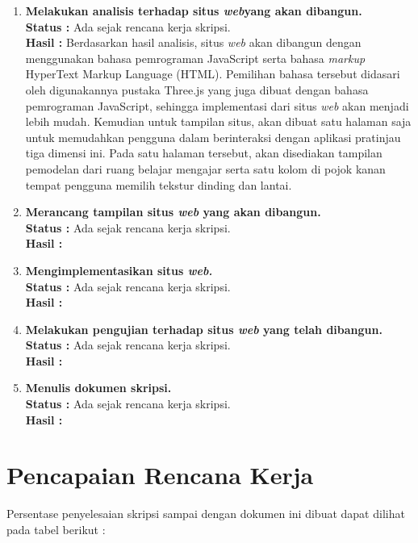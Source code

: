 \documentclass[a4paper,twoside]{article}
\begin{document}
\begin{enumerate}
		\item \textbf{Melakukan analisis terhadap situs \textit{\textbf{web}}yang akan dibangun.}\\
		{\bf Status :} Ada sejak rencana kerja skripsi.\\
		{\bf Hasil :} Berdasarkan hasil analisis, situs {\it web} akan dibangun dengan menggunakan bahasa pemrograman JavaScript serta bahasa {\it markup} HyperText Markup Language (HTML). Pemilihan bahasa tersebut didasari oleh digunakannya pustaka Three.js yang juga dibuat dengan bahasa pemrograman JavaScript, sehingga implementasi dari situs {\it web} akan menjadi lebih mudah. Kemudian untuk tampilan situs, akan dibuat satu halaman saja untuk memudahkan pengguna dalam berinteraksi dengan aplikasi pratinjau tiga dimensi ini. Pada satu halaman tersebut, akan disediakan tampilan pemodelan dari ruang belajar mengajar serta satu kolom di pojok kanan tempat pengguna memilih tekstur dinding dan lantai. 

		\item \textbf{Merancang tampilan situs \textit{\textbf{web}} yang akan dibangun.}\\
		{\bf Status :} Ada sejak rencana kerja skripsi.\\
		{\bf Hasil :}

		\item \textbf{Mengimplementasikan situs \textit{\textbf{web.}}}\\
		{\bf Status :} Ada sejak rencana kerja skripsi.\\
		{\bf Hasil :} 

		\item \textbf{Melakukan pengujian terhadap situs \textit{\textbf{web}} yang telah dibangun.} \\
		{\bf Status :} Ada sejak rencana kerja skripsi.\\
		{\bf Hasil :}

		\item \textbf{Menulis dokumen skripsi.}\\
		{\bf Status :} Ada sejak rencana kerja skripsi.\\
		{\bf Hasil :}
		
	\end{enumerate}

\section{Pencapaian Rencana Kerja}
Persentase penyelesaian skripsi sampai dengan dokumen ini dibuat dapat dilihat pada tabel berikut :
\end{document}
